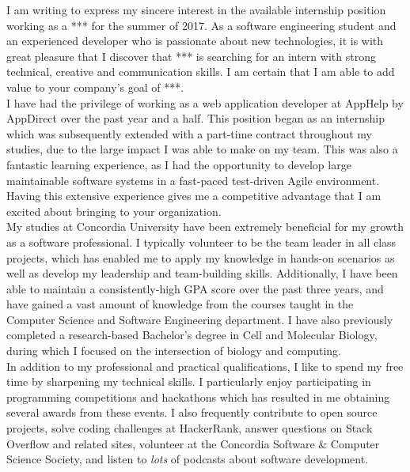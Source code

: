 \documentclass[11pt, a4paper]{awesome-cv}
\begin{document}
\begin{cvletter}
  \vspace{3mm}

  \normalsize I am writing to express my sincere interest in the available internship position working as a *** for the summer of 2017. As a software engineering student and an experienced developer who is passionate about new technologies, it is with great pleasure that I discover that *** is searching for an intern with strong technical, creative and communication skills. I am certain that I am able to add value to your company's goal of ***.\\

I have had the privilege of working as a web application developer at AppHelp by AppDirect over the past year and a half. This position began as an internship which was subsequently extended with a part-time contract throughout my studies, due to the large impact I was able to make on my team. This was also a fantastic learning experience, as I had the opportunity to develop large maintainable software systems in a fast-paced test-driven Agile environment. Having this extensive experience gives me a competitive advantage that I am excited about bringing to your organization.\\

My studies at Concordia University have been extremely beneficial for my growth as a software professional. I typically volunteer to be the team leader in all class projects, which has enabled me to apply my knowledge in hands-on scenarios as well as develop my leadership and team-building skills. Additionally, I have been able to maintain a consistently-high GPA score over the past three years, and have gained a vast amount of knowledge from the courses taught in the Computer Science and Software Engineering department. I have also previously completed a research-based Bachelor’s degree in Cell and Molecular Biology, during which I focused on the intersection of biology and computing.\\

In addition to my professional and practical qualifications, I like to spend my free time by sharpening my technical skills. I particularly enjoy participating in programming competitions and hackathons which has resulted in me obtaining several awards from these events. I also frequently contribute to open source projects, solve coding challenges at HackerRank, answer questions on Stack Overflow and related sites, volunteer at the Concordia Software \& Computer Science Society, and listen to \textit{lots} of podcasts about software development.\\


\end{cvletter}
\end{document}
